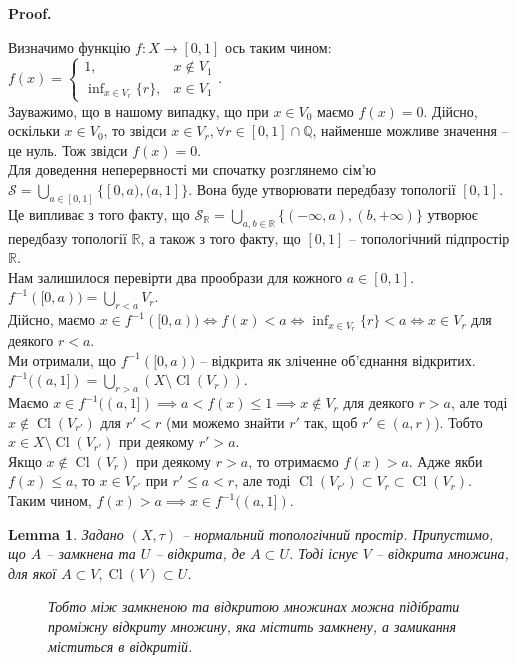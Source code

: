 \documentclass[a4paper, 10pt]{article}
\makeatletter
\theoremstyle{theoremdd}
\newtheorem{lemma}[theorem]{Lemma}
\DeclareMathOperator{\Cl}{Cl}
\renewenvironment{proof}[1][Proof.\\]{\par
\pushQED{\hfill \qed}%
\normalfont \topsep6\p@\@plus6\p@\relax
\trivlist
\item\relax
{\bfseries
#1\@addpunct{.}}\hspace\labelsep\ignorespaces
}{%
\popQED\endtrivlist\@endpefalse
}
\makeatother
\begin{document}
\begin{proof}
Визначимо функцію $f \colon X \to [0,1]$ ось таким чином: $f(x) = \begin{cases} 1, & x \notin V_1 \\ \inf_{x \in V_r} \{r\}, & x \in V_1 \end{cases}$. \\
Зауважимо, що в нашому випадку, що при $x \in V_0$ маємо $f(x) = 0$. Дійсно, оскільки $x \in V_0$, то звідси $x \in V_r, \forall r \in [0,1] \cap \mathbb{Q}$, найменше можливе значення -- це нуль. Тож звідси $f(x) = 0$.\\
Для доведення неперервності ми спочатку розглянемо сім'ю $\mathcal{S} = \displaystyle\bigcup_{a \in [0,1]} \{ [0,a), (a,1] \}$. Вона буде утворювати передбазу топології $[0,1]$. Це випливає з того факту, що $\mathcal{S}_{\mathbb{R}} = \displaystyle\bigcup_{a,b \in \mathbb{R}} \{(-\infty,a), (b,+\infty)\}$ утворює передбазу топології $\mathbb{R}$, а також з того факту, що $[0,1]$ -- топологічний підпростір $\mathbb{R}$.\\
Нам залишилося перевірти два прообрази для кожного $a \in [0,1]$.\\
$f^{-1}([0,a)) = \displaystyle\bigcup_{r < a} V_r$. \\
Дійсно, маємо $x \in f^{-1}([0,a)) \iff f(x) < a \iff \displaystyle\inf_{x \in V_r} \{r\} < a \iff x \in V_r$ для деякого $r < a$.\\
Ми отримали, що $f^{-1}([0,a))$ -- відкрита як зліченне об'єднання відкритих.\\
$f^{-1}((a,1]) = \displaystyle\bigcup_{r > a} (X \setminus \Cl(V_r))$.\\
Маємо $x \in f^{-1}((a,1]) \implies a < f(x) \leq 1 \implies x \notin V_r$ для деякого $r > a$, але тоді $x \notin \Cl(V_{r'})$ для $r' < r$ (ми можемо знайти $r'$ так, щоб $r' \in (a,r)$). Тобто $x \in X \setminus \Cl(V_{r'})$ при деякому $r' > a$.\\
Якщо $x \notin \Cl(V_r)$ при деякому $r > a$, то отримаємо $f(x) > a$. Адже якби $f(x) \leq a$, то $x \in V_{r'}$ при $r' \leq a < r$, але тоді $\Cl(V_{r'}) \subset V_r \subset \Cl(V_r)$. Таким чином, $f(x) > a \implies x \in f^{-1}((a,1])$.
\end{proof}

\begin{lemma}
Задано $(X,\tau)$ -- нормальний топологічний простір. Припустимо, що $A$ -- замкнена та $U$ -- відкрита, де $A \subset U$. Тоді існує $V$ -- відкрита множина, для якої $A \subset V, \Cl(V) \subset U$.
\begin{figure}[H]
\centering
{}
\caption*{Тобто між замкненою та відкритою множинах можна підібрати проміжну відкриту множину, яка містить замкнену, а замикання міститься в відкритій.}
\end{figure}
\end{lemma}
\end{document}
